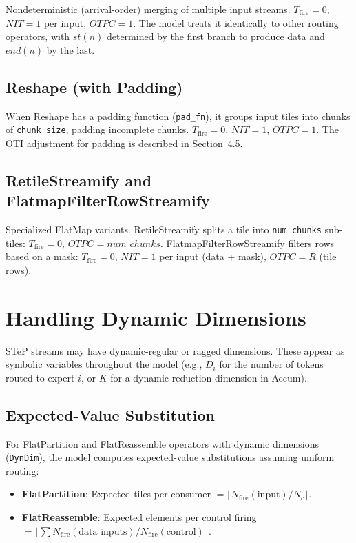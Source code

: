 \documentclass[10pt]{article}
\begin{document}
Nondeterministic (arrival-order) merging of multiple input streams. $T_{\text{fire}} = 0$, $\mathit{NIT} = 1$ per input, $\mathit{OTPC} = 1$. The model treats it identically to other routing operators, with $\mathit{st}(n)$ determined by the first branch to produce data and $\textit{end}(n)$ by the last.

\subsection{Reshape (with Padding)}

When Reshape has a padding function (\texttt{pad\_fn}), it groups input tiles into chunks of \texttt{chunk\_size}, padding incomplete chunks. $T_{\text{fire}} = 0$, $\mathit{NIT} = 1$, $\mathit{OTPC} = 1$. The OTI adjustment for padding is described in Section~4.5.

\subsection{RetileStreamify and FlatmapFilterRowStreamify}

Specialized FlatMap variants. RetileStreamify splits a tile into \texttt{num\_chunks} sub-tiles: $T_{\text{fire}} = 0$, $\mathit{OTPC} = \mathit{num\_chunks}$. FlatmapFilterRowStreamify filters rows based on a mask: $T_{\text{fire}} = 0$, $\mathit{NIT} = 1$ per input (data + mask), $\mathit{OTPC} = R$ (tile rows).

\section{Handling Dynamic Dimensions}

STeP streams may have dynamic-regular or ragged dimensions. These appear as symbolic variables throughout the model (e.g., $D_i$ for the number of tokens routed to expert $i$, or $K$ for a dynamic reduction dimension in Accum).

\subsection{Expected-Value Substitution}

For FlatPartition and FlatReassemble operators with dynamic dimensions (\texttt{DynDim}), the model computes expected-value substitutions assuming uniform routing:

\begin{itemize}[nosep]
    \item \textbf{FlatPartition}: Expected tiles per consumer $= \lfloor N_{\text{fire}}(\text{input}) / N_c \rfloor$.
    \item \textbf{FlatReassemble}: Expected elements per control firing $= \lfloor \sum N_{\text{fire}}(\text{data inputs}) / N_{\text{fire}}(\text{control}) \rfloor$.
\end{itemize}
\end{document}
